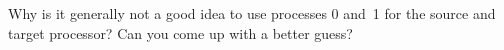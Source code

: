   Why is it generally not a good idea to use processes 0 and~1 for the
  source and target processor?  Can you come up with a better guess?
